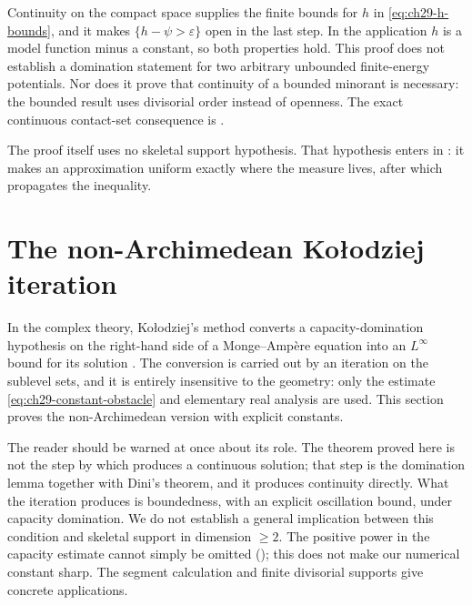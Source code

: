 \begin{remark}
\label{rem:ch29-continuity-of-h}
Continuity on the compact space supplies the finite bounds for $h$ in
\eqref{eq:ch29-h-bounds}, and it makes
$\{h-\psi>\varepsilon\}$ open in the last step.  In the application $h$
is a model function minus a constant, so both properties hold.
This proof does not establish a domination statement for two arbitrary
unbounded finite-energy potentials.  Nor does it prove that continuity
of a bounded minorant is necessary: the bounded result
 uses divisorial order instead
of openness.  The exact continuous contact-set consequence is
.
\end{remark}

The proof itself uses no skeletal support hypothesis.  That hypothesis
enters in : it makes an approximation uniform
exactly where the measure lives, after which
 propagates the inequality.

\section{The non-Archimedean Ko\l odziej iteration}
\label{sec:ch29-kolodziej}

In the complex theory, Ko\l odziej's method converts a capacity-domination
hypothesis on the right-hand side of a Monge--Amp\`ere equation into an
$L^\infty$ bound for its solution \cite{Kol98,Kol05}.  The conversion is
carried out by an iteration on the sublevel sets, and it is entirely
insensitive to the geometry: only the estimate
\eqref{eq:ch29-constant-obstacle} and elementary real analysis are used.
This section proves the non-Archimedean version with explicit constants.

The reader should be warned at once about its role.  The theorem proved here
is not the step by which  produces a
continuous solution; that step is the domination lemma together with Dini's
theorem, and it produces continuity directly.  What the iteration produces
is boundedness, with an explicit oscillation bound, under capacity
domination.  We do not establish a general implication between this
condition and skeletal support in dimension $\geq2$.  The positive
power in the capacity estimate cannot simply be omitted
(); this does not make our numerical constant
sharp.  The segment calculation and finite divisorial supports give
concrete applications.

